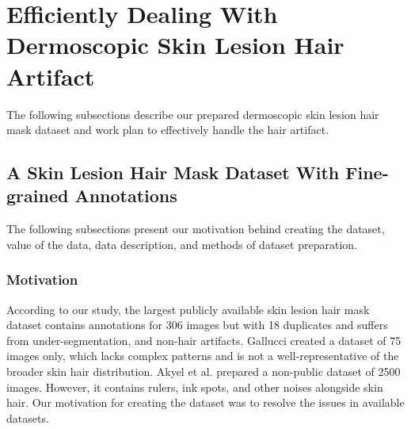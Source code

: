 \section{Efficiently Dealing With Dermoscopic Skin Lesion Hair Artifact}\label{sec:in_progress_hair}
The following subsections describe our prepared dermoscopic skin lesion hair mask dataset and work plan to effectively handle the hair artifact.

\subsection{A Skin Lesion Hair Mask Dataset With Fine-grained Annotations}
The following subsections present our motivation behind creating the dataset, value of the data, data description, and methods of dataset preparation.

\subsubsection{Motivation}
According to our study, the largest publicly available skin lesion hair mask dataset \cite{Li2021a} contains annotations for 306 images but with 18 duplicates and suffers from under-segmentation, and non-hair artifacts. Gallucci \cite{Gallucci2020} created a dataset of 75 images only, which lacks complex patterns and is not a well-representative of the broader skin hair distribution. Akyel et al. \cite{Akyel2022} prepared a non-public dataset of 2500 images. However, it contains rulers, ink spots, and other noises alongside skin hair. Our motivation for creating the dataset was to resolve the issues in available datasets.


